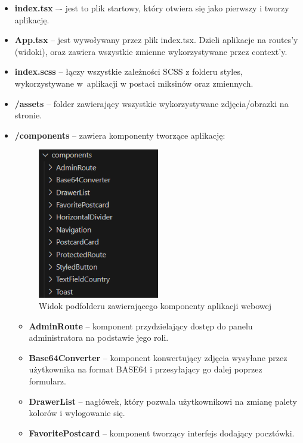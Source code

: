 \documentclass[a4paper,twoside,12pt]{book}
\begin{document}
\begin{itemize}
    \item \textbf{index.tsx} –- jest to plik startowy, który otwiera się jako pierwszy i tworzy aplikację.
    \item \textbf{App.tsx} -- jest wywoływany przez plik index.tsx. Dzieli aplikacje na routes’y (widoki), oraz zawiera wszystkie zmienne wykorzystywane przez context’y.
    \item \textbf{index.scss} -- łączy wszystkie zależności SCSS z folderu styles, wykorzystywane w~aplikacji w postaci miksinów oraz zmiennych.
    \item \textbf{/assets} -- folder zawierający wszystkie wykorzystywane zdjęcia/obrazki na stronie.
    \item \textbf{/components} -- zawiera komponenty tworzące aplikację:
        \begin{figure}[H]
            \centering
            \includegraphics[width=0.5\textwidth]{webowka_ss/komponenty.png}
            \caption{Widok podfolderu zawierającego komponenty aplikacji webowej}
        \end{figure}
        \begin{itemize}
            \item \textbf{AdminRoute} -- komponent przydzielający dostęp do panelu administratora na podstawie jego roli.
            \item \textbf{Base64Converter} -- komponent konwertujący zdjęcia wysyłane przez użytkownika na format BASE64 i przesyłający go dalej poprzez formularz.
            \item \textbf{DrawerList} -- nagłówek, który pozwala użytkownikowi na zmianę palety kolorów i wylogowanie się.
            \item \textbf{FavoritePostcard} -- komponent tworzący interfejs dodający pocztówki.

\end{itemize}
\end{itemize}
\end{document}
